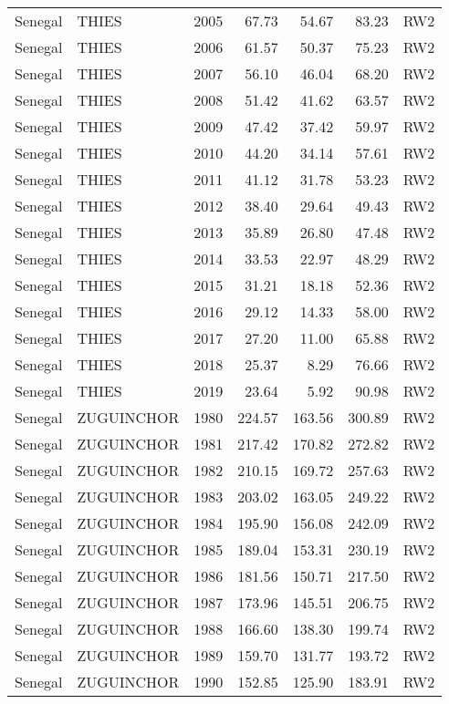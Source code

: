 \begin{longtable}{lllrrrl}
  Senegal & THIES & 2005 & 67.73 & 54.67 & 83.23 & RW2 \\ 
  Senegal & THIES & 2006 & 61.57 & 50.37 & 75.23 & RW2 \\ 
  Senegal & THIES & 2007 & 56.10 & 46.04 & 68.20 & RW2 \\ 
  Senegal & THIES & 2008 & 51.42 & 41.62 & 63.57 & RW2 \\ 
  Senegal & THIES & 2009 & 47.42 & 37.42 & 59.97 & RW2 \\ 
  Senegal & THIES & 2010 & 44.20 & 34.14 & 57.61 & RW2 \\ 
  Senegal & THIES & 2011 & 41.12 & 31.78 & 53.23 & RW2 \\ 
  Senegal & THIES & 2012 & 38.40 & 29.64 & 49.43 & RW2 \\ 
  Senegal & THIES & 2013 & 35.89 & 26.80 & 47.48 & RW2 \\ 
  Senegal & THIES & 2014 & 33.53 & 22.97 & 48.29 & RW2 \\ 
  Senegal & THIES & 2015 & 31.21 & 18.18 & 52.36 & RW2 \\ 
  Senegal & THIES & 2016 & 29.12 & 14.33 & 58.00 & RW2 \\ 
  Senegal & THIES & 2017 & 27.20 & 11.00 & 65.88 & RW2 \\ 
  Senegal & THIES & 2018 & 25.37 & 8.29 & 76.66 & RW2 \\ 
  Senegal & THIES & 2019 & 23.64 & 5.92 & 90.98 & RW2 \\ 
  Senegal & ZUGUINCHOR & 1980 & 224.57 & 163.56 & 300.89 & RW2 \\ 
  Senegal & ZUGUINCHOR & 1981 & 217.42 & 170.82 & 272.82 & RW2 \\ 
  Senegal & ZUGUINCHOR & 1982 & 210.15 & 169.72 & 257.63 & RW2 \\ 
  Senegal & ZUGUINCHOR & 1983 & 203.02 & 163.05 & 249.22 & RW2 \\ 
  Senegal & ZUGUINCHOR & 1984 & 195.90 & 156.08 & 242.09 & RW2 \\ 
  Senegal & ZUGUINCHOR & 1985 & 189.04 & 153.31 & 230.19 & RW2 \\ 
  Senegal & ZUGUINCHOR & 1986 & 181.56 & 150.71 & 217.50 & RW2 \\ 
  Senegal & ZUGUINCHOR & 1987 & 173.96 & 145.51 & 206.75 & RW2 \\ 
  Senegal & ZUGUINCHOR & 1988 & 166.60 & 138.30 & 199.74 & RW2 \\ 
  Senegal & ZUGUINCHOR & 1989 & 159.70 & 131.77 & 193.72 & RW2 \\ 
  Senegal & ZUGUINCHOR & 1990 & 152.85 & 125.90 & 183.91 & RW2 \\ 

\end{longtable}
